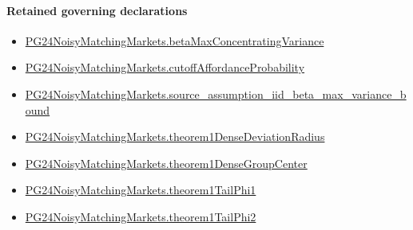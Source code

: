 \documentclass[10pt]{article}
\begin{document}
\paragraph{Retained governing declarations}
\begin{itemize}\raggedright
\item \hyperlink{governing-declaration-322e8322d17fd70c}{PG24\allowbreak{}Noisy\allowbreak{}Matching\allowbreak{}Markets.\allowbreak{}beta\allowbreak{}Max\allowbreak{}Concentrating\allowbreak{}Variance}
\item \hyperlink{governing-declaration-a4a2a08d89f647e4}{PG24\allowbreak{}Noisy\allowbreak{}Matching\allowbreak{}Markets.\allowbreak{}cutoff\allowbreak{}Affordance\allowbreak{}Probability}
\item \hyperlink{governing-declaration-106a735d10bd3342}{PG24\allowbreak{}Noisy\allowbreak{}Matching\allowbreak{}Markets.\allowbreak{}source\_\allowbreak{}assumption\_\allowbreak{}iid\_\allowbreak{}beta\_\allowbreak{}max\_\allowbreak{}variance\_\allowbreak{}bound}
\item \hyperlink{governing-declaration-2bd27a17fcef3b94}{PG24\allowbreak{}Noisy\allowbreak{}Matching\allowbreak{}Markets.\allowbreak{}theorem1\allowbreak{}Dense\allowbreak{}Deviation\allowbreak{}Radius}
\item \hyperlink{governing-declaration-3d82e494d5b1dcdc}{PG24\allowbreak{}Noisy\allowbreak{}Matching\allowbreak{}Markets.\allowbreak{}theorem1\allowbreak{}Dense\allowbreak{}Group\allowbreak{}Center}
\item \hyperlink{governing-declaration-296c254211118e37}{PG24\allowbreak{}Noisy\allowbreak{}Matching\allowbreak{}Markets.\allowbreak{}theorem1\allowbreak{}Tail\allowbreak{}Phi1}
\item \hyperlink{governing-declaration-7a36399b03a33917}{PG24\allowbreak{}Noisy\allowbreak{}Matching\allowbreak{}Markets.\allowbreak{}theorem1\allowbreak{}Tail\allowbreak{}Phi2}
\end{itemize}
\end{document}
